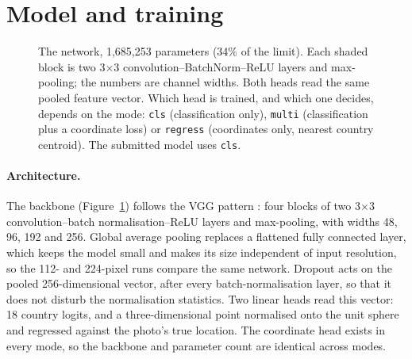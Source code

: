 \documentclass[11pt,a4paper]{article}
\begin{document}
\section{Model and training}
\begin{figure}[t]
\centering
{}
\caption{The network, 1,685,253 parameters (34\% of the limit). Each shaded block is two 3$\times$3 convolution--BatchNorm--ReLU layers and max-pooling; the numbers are channel widths. Both heads read the same pooled feature vector. Which head is trained, and which one decides, depends on the mode: \texttt{cls} (classification only), \texttt{multi} (classification plus a coordinate loss) or \texttt{regress} (coordinates only, nearest country centroid). The submitted model uses \texttt{cls}.}
\label{fig:model}
\end{figure}

\paragraph{Architecture.} The backbone (Figure~\ref{fig:model}) follows the VGG pattern \citep{vgg}: four blocks of two 3$\times$3 convolution--batch normalisation--ReLU layers \citep{bn} and max-pooling, with widths 48, 96, 192 and 256. Global average pooling \citep{nin} replaces a flattened fully connected layer, which keeps the model small and makes its size independent of input resolution, so the 112- and 224-pixel runs compare the same network. Dropout \citep{dropout} acts on the pooled 256-dimensional vector, after every batch-normalisation layer, so that it does not disturb the normalisation statistics. Two linear heads read this vector: 18 country logits, and a three-dimensional point normalised onto the unit sphere and regressed against the photo's true location. The coordinate head exists in every mode, so the backbone and parameter count are identical across modes.
\end{document}

